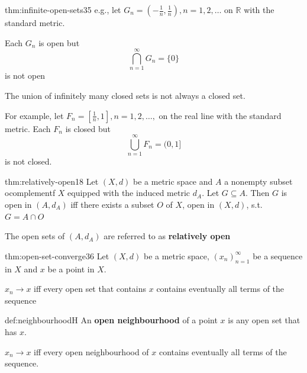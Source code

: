 \documentclass[landscape, 8pt]{extarticle}
\begin{document}
\begin{multicols}{3}
\begin{rem}{thm:infinite-open-sets}{35}
    e.g., let $G_{n} = (- \frac{1}{n}, \frac{1}{n}), n = 1,2,\dots$ on $\mathbb{R}$ with the standard metric.

    Each $G_{n}$ is open but
    \vspace{-2pt}
    \[\bigcap\limits_{n = 1}^{\infty} G_{n} = \{0\}\]
    is not open

    \vspace{-2pt}

    \vspace{-2pt}
    The union of infinitely many closed sets is not always a closed set.

    For example, let $F_{n} = [\frac{1}{n}, 1], n=1,2,\dots,$ on the real line with the standard metric.
    Each $F_{n}$ is closed but
    \vspace{-2pt}
    \[\bigcup\limits_{n = 1}^{\infty}F_{n} = (0,1]\]
    is not closed.
\end{rem}

\vspace{-7pt}
\begin{thm}{thm:relatively-open}{18}
    \vspace{-5pt}
    Let $(X,d)$ be a metric space and $A$ a nonempty subset ocomplementf $X$ equipped with the induced metric $d_{A}$. Let $G\subseteq A$. Then $G$ is open in $(A, d_{A})$ iff there exists a subset $O$ of $X$, open in $(X,d)$, s.t. $G = A \cap O$

    The open sets of $(A, d_{A})$ are referred to as \textbf{relatively open}
\end{thm}

\vspace{-7pt}
\begin{thm}[]{thm:open-set-converge}{36}
    \vspace{-5pt}
    Let $(X, d)$ be a metric space, $(x_{n})^{\infty}_{n=1}$ be a sequence in $X$ and $x$ be a point in $X$.

    $x_{n}\to x$ iff every open set that contains $x$ contains eventually all terms of the sequence
\end{thm}

\vspace{-5pt}
\begin{dfn}{def:neighbourhood}{H}
    \vspace{-5pt}
    An \textbf{open neighbourhood} of a point $x$ is any open set that has $x$. 

    $x_{n}\to x$ iff every open neighbourhood of $x$ contains eventually all terms of the sequence.


\end{dfn}
\end{multicols}
\end{document}
